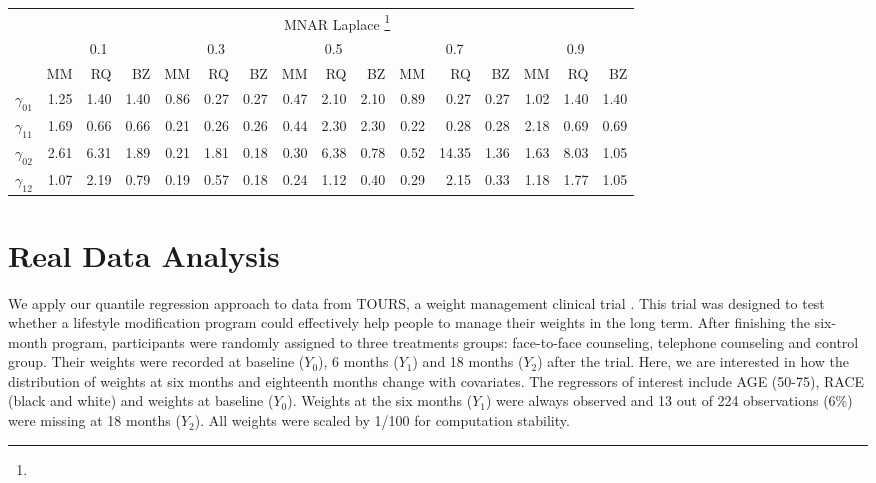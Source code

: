 \documentclass[12pt]{article}
\begin{document}
\begin{table}[h]
  \begin{tabular}{rrrrrrrrrrrrrrrr}
    \toprule
    & \multicolumn{15}{c}{MNAR Laplace \footnote{}} \\
    \cline{2-16}
    &  \multicolumn{3}{c}{0.1} &  \multicolumn{3}{c}{0.3} &  \multicolumn{3}{c}{0.5} &
    \multicolumn{3}{c}{0.7} &  \multicolumn{3}{c}{0.9} \\
    \cline{2-16}
    & MM   & RQ   & BZ   & MM   & RQ   & BZ   & MM   & RQ   & BZ   & MM   & RQ   & BZ   & MM   & RQ   & BZ   \\
    \hline
    $\gamma_{01}$ & 1.25 & 1.40 & 1.40 & 0.86 & 0.27 & 0.27 & 0.47 & 2.10 & 2.10 & 0.89 & 0.27 & 0.27 & 1.02 & 1.40 & 1.40  \\
    $\gamma_{11}$ & 1.69 & 0.66 & 0.66 & 0.21 & 0.26 & 0.26 & 0.44 & 2.30 & 2.30 & 0.22 & 0.28 & 0.28 & 2.18 & 0.69 & 0.69  \\
    $\gamma_{02}$ & 2.61 & 6.31 & 1.89 & 0.21 & 1.81 & 0.18 & 0.30 & 6.38 & 0.78 & 0.52 & 14.35 & 1.36 & 1.63 & 8.03 & 1.05 \\
    $\gamma_{12}$ & 1.07 & 2.19 & 0.79 & 0.19 & 0.57 & 0.18 & 0.24 & 1.12 & 0.40 & 0.29 & 2.15 & 0.33 & 1.18 & 1.77 & 1.05  \\
    \bottomrule
  \end{tabular}

\end{table}

\section{Real Data Analysis}
\label{sec:real}
We apply our quantile regression approach to data from TOURS, a weight
management clinical trial \citep{perri2008extended}.  This trial was
designed to test whether a lifestyle modification program could
effectively help people to manage their weights in the long
term. After finishing the six-month program, participants were
randomly assigned to three treatments groups: face-to-face counseling,
telephone counseling and control group. Their weights were recorded at
baseline ($Y_0$), 6 months ($Y_1$) and 18 months ($Y_2$) after the
trial. Here, we are interested in how the distribution of weights at
six months and eighteenth months change with covariates. The
regressors of interest include AGE (50-75), RACE (black and white) and
weights at baseline ($Y_0$). Weights at the six months ($Y_1$) were
always observed and 13 out of 224 observations (6\%) were missing at
18 months ($Y_2$). All weights were scaled by 1/100 for computation
stability.
\end{document}
